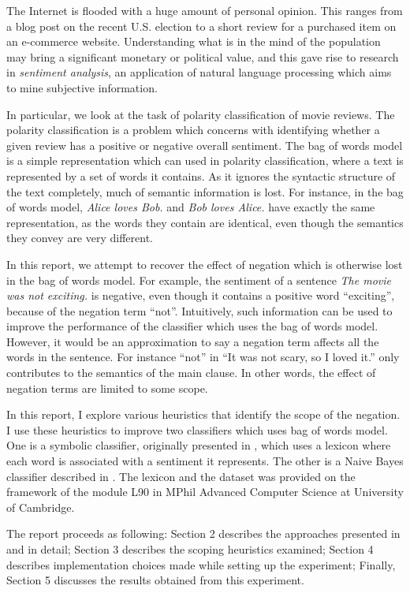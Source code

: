 The Internet is flooded with a huge amount of personal opinion. This ranges from a blog post on the recent U.S. election to a short review for a purchased item on an e-commerce website. Understanding what is in the mind of the population may bring a significant monetary or political value, and this gave rise to research in {\em sentiment analysis}, an application of natural language processing which aims to mine subjective information.

In particular, we look at the task of polarity classification of movie reviews. The polarity classification is a problem which concerns with identifying whether a given review has a positive or negative overall sentiment. The bag of words model is a simple representation which can used in polarity classification, where a text is represented by a set of words it contains. As it ignores the syntactic structure of the text completely, much of semantic information is lost. For instance, in the bag of words model, \textit{Alice loves Bob.} and \textit{Bob loves Alice.} have exactly the same representation, as the words they contain are identical, even though the semantics they convey are very different.

In this report, we attempt to recover the effect of negation which is otherwise lost in the bag of words model. For example, the sentiment of a sentence \textit{The movie was not exciting.} is negative, even though it contains a positive word ``exciting'', because of the negation term ``not''. Intuitively, such information can be used to improve the performance of the classifier which uses the bag of words model. However, it would be an approximation to say a negation term affects all the words in the sentence. For instance ``not'' in ``It was not scary, so I loved it.'' only contributes to the semantics of the main clause. In other words, the effect of negation terms are limited to some scope.

In this report, I explore various heuristics that identify the scope of the negation. I use these heuristics to improve two classifiers which uses bag of words model. One is a symbolic classifier, originally presented in \cite{wilson2005recognizing}, which uses a lexicon where each word is associated with a sentiment it represents. The other is a Naive Bayes classifier described in \cite{pang2002thumbs}. The lexicon and the dataset was provided on the framework of the module L90 in MPhil Advanced Computer Science at University of Cambridge.

The report proceeds as following: Section 2 describes the approaches presented in \cite{wilson2005recognizing} and \cite{pang2002thumbs} in detail; Section 3 describes the scoping heuristics examined; Section 4 describes implementation choices made while setting up the experiment; Finally, Section 5 discusses the results obtained from this experiment.


